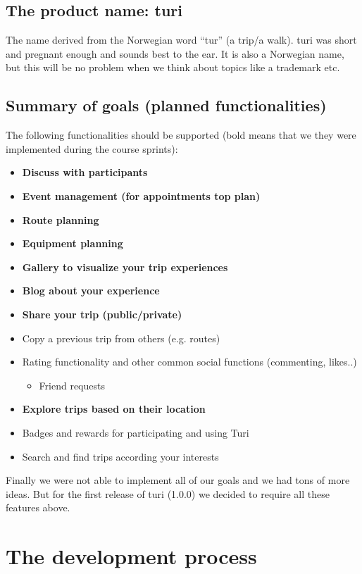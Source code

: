\documentclass[a4paper]{article}
\begin{document}
\subsection{The product name: turi}
The name derived from the Norwegian word “tur” (a trip/a walk). turi was short and pregnant enough and sounds best to the ear. It is also a Norwegian name, but this will be no problem when we think about topics like a trademark etc.

\subsection{Summary of goals (planned functionalities)}
The following functionalities should be supported (bold means that we they were implemented during the course sprints):
\begin{itemize}
  \item {\textbf{Discuss with participants}}
  \item {\textbf{Event management (for appointments top plan)}}
  \item {\textbf{Route planning}}
  \item {\textbf{Equipment planning}}
  \item {\textbf{Gallery to visualize your trip experiences}}
  \item {\textbf{Blog about your experience}}
  \item {\textbf{Share your trip (public/private)}}
  \item {Copy a previous trip from others (e.g. routes)}
  \item {Rating functionality and other common social functions (commenting, likes..)
  \begin{itemize}
    \item {Friend requests}
  \end{itemize}}
  \item {\textbf{Explore trips based on their location}}
  \item {Badges and rewards for participating and using Turi}
  \item {Search and find trips according your interests}
\end{itemize}

\noindent
Finally we were not able to implement all of our goals and we had tons of more ideas. But for the first release of turi (1.0.0) we decided to require all these features above.


\section{The development process}
\end{document}
